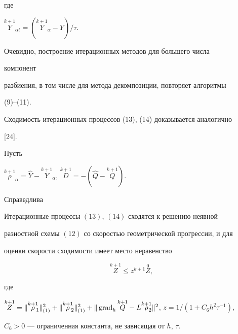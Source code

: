 где


$\overset{k+1}{Y}_{\!\!\!\alpha t} =(\overset{k+1}{Y}_{\!\!\!\alpha}


-Y)/\tau$.


Очевидно, построение итерационных методов для большего числа


компонент


разбиения, в том числе для метода декомпозиции, повторяет алгоритмы


(9)--(11).





Сходимость итерационных процессов (13), (14) доказывается аналогично


[24].


Пусть


$\overset{k+1}{\rho}_{\!\!\!\alpha} =\widehat Y-


\overset{k+1}{Y}_{\!\!\!\alpha}$, $\overset{k+1}{D}{}=-


(\widehat Q -\overset{k+1}{Q}{})$.


Справедлива





\begin{thm}


Итерационные процессы $(13)$, $(14)$ сходятся к решению неявной


разностной схемы $(12)$ со скоростью геометрической прогрессии, и для


оценки скорости сходимости имеет место неравенство


\begin{equation}


\overset{k+1}{Z}{}\leq z^{k+1}\overset{0}{Z},


\end{equation}


где


$\overset{k+1}{Z}=\|\overset{k+1}{\rho}_{\!\!1}\|_{(1)}^2+


\|\overset{k+1}{\rho}_{\!\!2}\|_{(1)}^2+


\|\Grad_h \overset{k+1}{Q}{}-


L\overset{k+1}{\rho}_{\!\!\!2}\|^2$, $z=1/(1+C_6h^2\tau^{-1})$,


$C_6>0$ --- ограниченная константа, не зависящая от $h$, $\tau$.


\end{thm}





